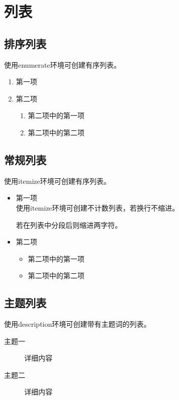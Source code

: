 \clearpage
\section{列表}

\subsection{排序列表}
使用enumerate环境可创建有序列表。
\begin{enumerate}
\item 第一项
\item 第二项	
\begin{enumerate}
	\item 第二项中的第一项
	\item 第二项中的第二项
	\end{enumerate}
\end{enumerate}

\subsection{常规列表}
使用itemize环境可创建有序列表。
\begin{itemize}
\item 第一项\\
使用itemize环境可创建不计数列表，若换行不缩进。\par
若在列表中分段后则缩进两字符。
\item 第二项
	\begin{itemize}
	\item 第二项中的第一项
	\item 第二项中的第二项
	\end{itemize}
\end{itemize}

\subsection{主题列表}
使用description环境可创建带有主题词的列表。
\begin{description}
	\item[主题一] 详细内容
	\item[主题二] 详细内容
\end{description} 